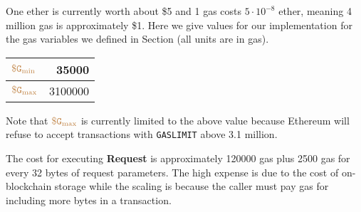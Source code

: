 One ether is currently worth about \$5 and 1 gas costs $5 \cdot 10^{-8}$ ether, meaning 4 million gas is approximately \$1.
Here we give values for our implementation for the gas variables we defined in Section  (all units are in gas).
\begin{center}
  \begin{tabular}{lr}
    \hline
    $\tt {\color{brown} \$G_\text{min} }$ & \num[group-separator={,}]{35000} \\
    \hline
    $\tt {\color{brown} \$G_\text{max} }$ & \num[group-separator={,}]{3100000} \\
    \hline
  \end{tabular}
\end{center}
Note that $\tt {\color{brown} \$G_\text{max} }$ is currently limited to the above value because Ethereum will refuse to accept transactions with {\tt GASLIMIT} above 3.1 million.


The cost for executing {\bf Request} is approximately \num[group-separator={,}]{120000} gas plus \num[group-separator={,}]{2500} gas for every 32 bytes of request parameters.
The high expense is due to the cost of on-blockchain storage
while the scaling is because the caller must pay gas for including more bytes in a transaction.


